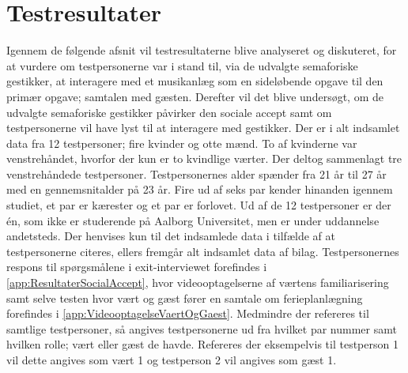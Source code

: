 \chapter{Testresultater}
\label{TestresultaterSocialAccept}
%
Igennem de følgende afsnit vil testresultaterne blive analyseret og diskuteret, for at vurdere om testpersonerne var i stand til, via de udvalgte semaforiske gestikker, at interagere med et musikanlæg som en sideløbende opgave til den primær opgave; samtalen med gæsten. Derefter vil det blive undersøgt, om de udvalgte semaforiske gestikker påvirker den sociale accept samt om testpersonerne vil have lyst til at interagere med gestikker.\blankline
%
Der er i alt indsamlet data fra 12 testpersoner; fire kvinder og otte mænd. To af kvinderne var venstrehåndet, hvorfor der kun er to kvindlige værter. Der deltog sammenlagt tre venstrehåndede testpersoner. Testpersonernes alder spænder fra 21 år til 27 år med en gennemsnitalder på 23 år. Fire ud af seks par kender hinanden igennem studiet, et par er kærester og et par er forlovet. Ud af de 12 testpersoner er der én, som ikke er studerende på Aalborg Universitet, men er under uddannelse andetsteds. Der henvises kun til det indsamlede data i tilfælde af at testpersonerne citeres, ellers fremgår alt indsamlet data af bilag. Testpersonernes respons til spørgsmålene i exit-interviewet forefindes i \autoref{app:ResultaterSocialAccept}, hvor videooptagelserne af værtens familiarisering samt selve testen hvor vært og gæst fører en samtale om ferieplanlægning forefindes i \autoref{app:VideooptagelseVaertOgGaest}. Medmindre der refereres til samtlige testpersoner, så angives testpersonerne ud fra hvilket par nummer samt hvilken rolle; vært eller gæst de havde. Refereres der eksempelvis til testperson 1 vil dette angives som vært 1 og testperson 2 vil angives som gæst 1. 



